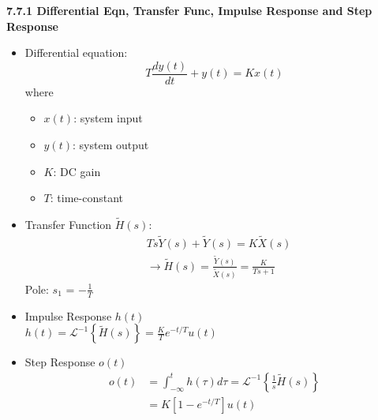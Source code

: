\documentclass[landscape,a4paper]{extarticle}
\newcommand{\invlap}[1]{\mathcal{L}^{-1}\left\{#1\right\}}
\begin{document}
\begin{multicols*}{5}
    \textbf{7.7.1 Differential Eqn, Transfer Func, Impulse Response and Step Response}
    \begin{itemize}
        \item Differential equation:
        \[
            T\frac{dy(t)}{dt}+y(t)=Kx(t) \tag{7.26}
        \]
        where 
        \begin{itemize}
            \item $x(t)$: system input
            \item $y(t)$: system output
            \item $K$: DC gain
            \item $T$: time-constant
        \end{itemize}
        \item Transfer Function $\tilde{H}(s)$:
        \begin{align*}
            &Ts\tilde{Y}(s) + \tilde{Y}(s) = K \tilde{X}(s)\\
            &\rightarrow \tilde{H}(s) = \frac{\tilde{Y}(s)}{\tilde{X}(s)} = \frac{K}{Ts + 1} \tag{7.27}
        \end{align*}
        Pole: $s_1$ = $-\frac{1}{T}$
        \item Impulse Response $h(t)$\\
        $h(t) = \invlap{\tilde{H}(s)} = \frac{K}{T}e^{-t/T}u(t)$
        \item Step Response $o(t)$
        \begin{align*}
            o(t) &= \int_{-\infty}^{t} h(\tau) d \tau = \invlap{\frac{1}{s}\tilde{H}(s)}\\
            &= K\left[1-e^{-t/T}\right]u(t)
        \end{align*}
    \end{itemize}


\end{multicols*}
\end{document}

